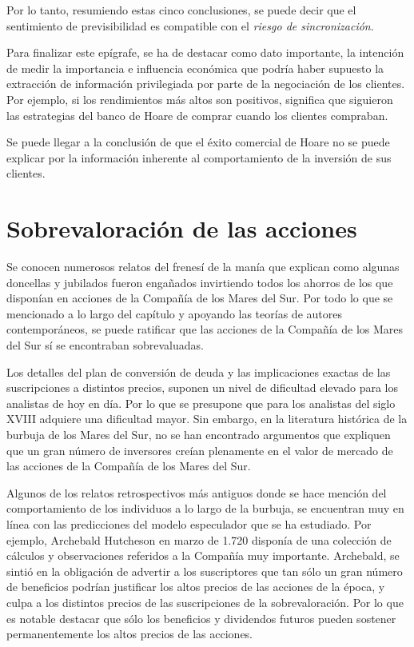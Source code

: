 Por lo tanto, resumiendo estas cinco conclusiones, se puede decir que el sentimiento de previsibilidad es compatible con el \emph{riesgo de sincronización}.

Para finalizar este epígrafe, se ha de destacar como dato importante, la intención de medir la importancia e influencia económica que podría haber supuesto la extracción de información privilegiada por parte de la negociación de los clientes. Por ejemplo, si los rendimientos más altos son positivos, significa que siguieron las estrategias del banco de Hoare de comprar cuando los clientes compraban.

Se puede llegar a la conclusión de que el éxito comercial de Hoare no se puede explicar por la información inherente al comportamiento de la inversión de sus clientes.

\section{Sobrevaloración de las acciones}

Se conocen numerosos relatos del frenesí de la manía que explican como algunas doncellas y jubilados fueron engañados invirtiendo todos los ahorros de los que disponían en acciones de la Compañía de los Mares del Sur. Por todo lo que se mencionado a lo largo del capítulo y apoyando las teorías de autores contemporáneos, se puede ratificar que las acciones de la Compañía de los Mares del Sur sí se encontraban sobrevaluadas.

Los detalles del plan de conversión de deuda y las implicaciones exactas de las suscripciones a distintos precios, suponen un nivel de dificultad elevado para los analistas de hoy en día. Por lo que se presupone que para los analistas del siglo XVIII adquiere una dificultad mayor. Sin embargo, en la literatura histórica de la burbuja de los Mares del Sur, no se han encontrado argumentos que expliquen que un gran número de inversores creían plenamente en el valor de mercado de las acciones de la Compañía de los Mares del Sur.

Algunos de los relatos retrospectivos más antiguos donde se hace mención del comportamiento de los individuos a lo largo de la burbuja, se encuentran muy en línea con las predicciones del modelo especulador que se ha estudiado. Por ejemplo, Archebald Hutcheson en marzo de 1.720 disponía de una colección de cálculos y observaciones referidos a la Compañía muy importante. Archebald, se sintió en la obligación de advertir a los suscriptores que tan sólo un gran número de beneficios podrían justificar los altos precios de las acciones de la época, y culpa a los distintos precios de las suscripciones de la sobrevaloración. Por lo que es notable destacar que sólo los beneficios y dividendos futuros pueden sostener permanentemente los altos precios de las acciones. 

